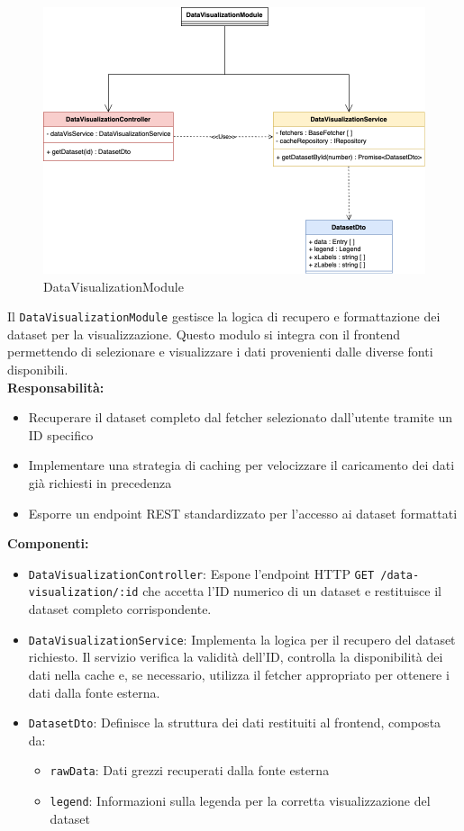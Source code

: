 \begin{figure}[H] 
    \centering
    \includegraphics[scale = 0.5]{template/images/uml_back/DataVisModule.png}
    \caption{DataVisualizationModule}
\end{figure}

Il \texttt{DataVisualizationModule} gestisce la logica di recupero e formattazione dei dataset per la visualizzazione. Questo modulo si integra con il frontend permettendo di selezionare e visualizzare i dati provenienti dalle diverse fonti disponibili.\\

\textbf{Responsabilità:}
\begin{itemize}
    \item Recuperare il dataset completo dal fetcher selezionato dall'utente tramite un ID specifico
    \item Implementare una strategia di caching per velocizzare il caricamento dei dati già richiesti in precedenza
    \item Esporre un endpoint REST standardizzato per l'accesso ai dataset formattati
\end{itemize}

\textbf{Componenti:}
\begin{itemize}
    \item \texttt{DataVisualizationController}: Espone l'endpoint HTTP \texttt{GET /data-visualization/:id} che accetta l'ID numerico di un dataset e restituisce il dataset completo corrispondente.
    \item \texttt{DataVisualizationService}: Implementa la logica per il recupero del dataset richiesto. Il servizio verifica la validità dell'ID, controlla la disponibilità dei dati nella cache e, se necessario, utilizza il fetcher appropriato per ottenere i dati dalla fonte esterna.
    \item \texttt{DatasetDto}: Definisce la struttura dei dati restituiti al frontend, composta da:
    \begin{itemize}
        \item \texttt{rawData}: Dati grezzi recuperati dalla fonte esterna
        \item \texttt{legend}: Informazioni sulla legenda per la corretta visualizzazione del dataset
    \end{itemize}
\end{itemize}

